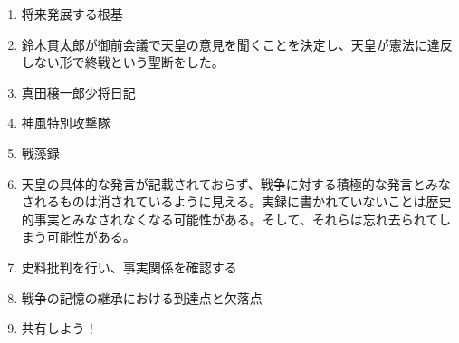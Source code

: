 \documentclass[]{jsarticle}
\begin{document}
\begin{enumerate}
	\item 将来発展する根基
	\item 鈴木貫太郎が御前会議で天皇の意見を聞くことを決定し、天皇が憲法に違反しない形で終戦という聖断をした。
	\\
	\item 真田穣一郎少将日記
	\item 神風特別攻撃隊
	\item 戦藻録
	\item 天皇の具体的な発言が記載されておらず、戦争に対する積極的な発言とみなされるものは消されているように見える。実録に書かれていないことは歴史的事実とみなされなくなる可能性がある。そして、それらは忘れ去られてしまう可能性がある。
	\item 史料批判を行い、事実関係を確認する
	\item 戦争の記憶の継承における到達点と欠落点
	\item 共有しよう！
\end{enumerate}
\end{document}
